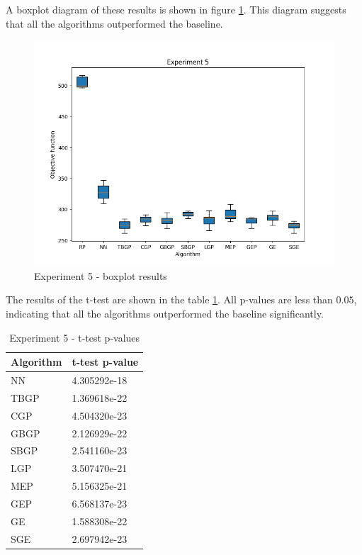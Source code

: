 A boxplot diagram of these results is shown in figure \ref{fig:experiment5}. This diagram suggests that all the algorithms outperformed the baseline.

\begin{figure}[!htbp]
	\centering
	\includegraphics[scale=0.7]{../images/experiment5.png}
	\caption{Experiment 5 - boxplot results}
    \label{fig:experiment5}
\end{figure}

The results of the t-test are shown in the table \ref{tab:experiment5_stat}. All p-values are less than $0.05$, indicating that all the algorithms outperformed the baseline significantly.

\begin{table}[!htbp]
    \begin{center}
        \begin{tabular}{|l|l|} 
         \hline
            Algorithm & t-test p-value \\ [0.5ex] \hline\hline
            NN & 4.305292e-18 \\
            \hline
            TBGP & 1.369618e-22 \\
            \hline
            CGP & 4.504320e-23 \\
            \hline
            GBGP & 2.126929e-22 \\
            \hline
            SBGP & 2.541160e-23 \\
            \hline
            LGP & 3.507470e-21 \\
            \hline
            MEP & 5.156325e-21 \\
            \hline
            GEP & 6.568137e-23 \\
            \hline
            GE & 1.588308e-22 \\
            \hline
            SGE & 2.697942e-23 \\
            \hline
        \end{tabular}
    \end{center}
    \caption{Experiment 5 - t-test p-values}
\label{tab:experiment5_stat}
\end{table}

